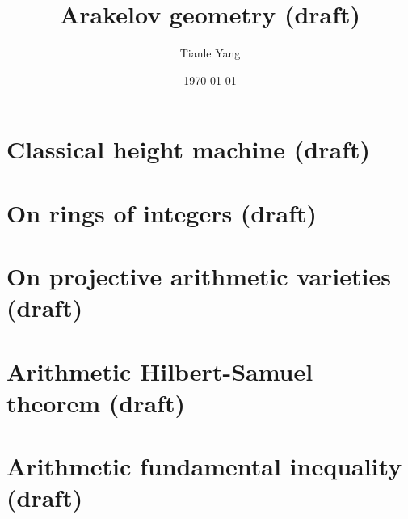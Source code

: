 \documentclass[sectionlevel=chapter]{noteformyself}
\title{Arakelov geometry (draft)}
\author{Tianle Yang}
\date{\today}
\begin{document}
    \maketitle

    \tableofcontents

    \section{Classical height machine (draft)}
    
    \section{On rings of integers (draft)}
    
    \section{On projective arithmetic varieties (draft)}
    
    \section{Arithmetic Hilbert-Samuel theorem (draft)}
    
    \section{Arithmetic fundamental inequality (draft)}
    

    
\end{document}
